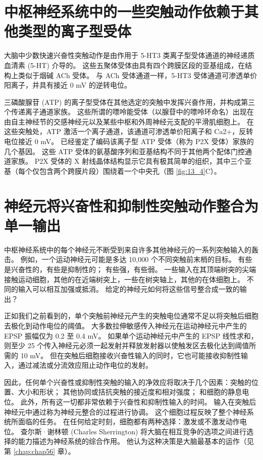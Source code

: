 \section{中枢神经系统中的一些突触动作依赖于其他类型的离子型受体}
大脑中少数快速兴奋性突触动作是由作用于 5-HT3 类离子型受体通道的神经递质血清素 (5-HT) 介导的。 
这些五聚体受体由具有四个跨膜区段的亚基组成，在结构上类似于烟碱 ACh 受体。 
与 ACh 受体通道一样，5-HT3 受体通道可渗透单价阳离子，并具有接近 0 mV 的逆转电位。


三磷酸腺苷 (ATP) 的离子型受体在其他选定的突触中发挥兴奋作用，并构成第三个传递离子通道家族。
这些所谓的嘌呤能受体（以腺苷中的嘌呤环命名）出现在由自主神经节的交感神经元以及某些中枢和外周神经元支配的平滑肌细胞上。
在这些突触处，ATP 激活一个离子通道，该通道可渗透单价阳离子和 Ca2+，反转电位接近 0 mV。
已经鉴定了编码该离子型 ATP 受体（称为 P2X 受体）家族的几个基因。 
这些 ATP 受体的氨基酸序列和亚基结构不同于其他两个配体门控通道家族。 
P2X 受体的 X 射线晶体结构显示它具有极其简单的组织，其中三个亚基（每个仅包含两个跨膜片段）围绕着一个中央孔（图 \ref{fig:13_4}C）。



\section{神经元将兴奋性和抑制性突触动作整合为单一输出}
中枢神经系统中的每个神经元不断受到来自许多其他神经元的一系列突触输入的轰击。 
例如，一个运动神经元可能是多达 10,000 个不同突触前末梢的目标。 
有些是兴奋性的，有些是抑制性的； 有些强，有些弱。 一些输入在其顶端树突的尖端接触运动细胞，其他的在近端树突上，一些在树突轴上，其他的在体细胞上。 
不同的输入可以相互加强或抵消。 
给定的神经元如何将这些信号整合成一致的输出？


正如我们之前看到的，单个突触前神经元产生的突触电位通常不足以将突触后细胞去极化到动作电位的阈值。 
大多数拉伸敏感传入神经元在运动神经元中产生的 EPSP 振幅仅为 0.2 至 0.4 mV。 
如果单个运动神经元中产生的 EPSP 线性求和，则至少 25 个传入神经元必须一起发射并释放发射器以使触发区去极化达到阈值所需的 10 mV。 
但在突触后细胞接收兴奋性输入的同时，它也可能接收抑制性输入，通过减法或分流效应阻止动作电位的发射。


因此，任何单个兴奋性或抑制性突触的输入的净效应将取决于几个因素：突触的位置、大小和形状； 其他协同或拮抗突触的接近度和相对强度； 和细胞的静息电位。 
此外，所有这一切都非常依赖于兴奋性和抑制性输入的时间。 
输入在突触后神经元中通过称为神经元整合的过程进行协调。 
这个细胞过程反映了整个神经系统所面临的任务。 
在任何给定时刻，细胞都有两种选择：激发或不激发动作电位。
查尔斯·谢林顿 (Charles Sherrington) 将大脑在相互竞争的选项之间进行选择的能力描述为神经系统的综合作用。 
他认为这种决策是大脑最基本的运作（见第 \ref{chap:chap56} 章）。


